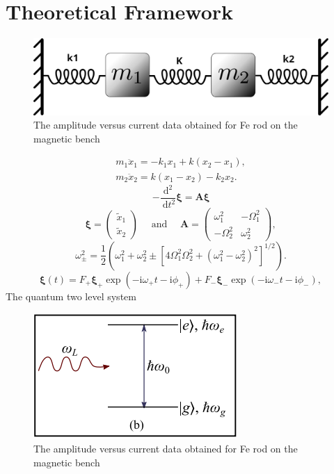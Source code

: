 \section{Theoretical Framework}
\begin{figure}[H]
	\centering
	\includegraphics[scale=0.3]{coupled1.png}
	\caption{The amplitude versus current data obtained for Fe rod on the magnetic bench}
	\label{fig:mb-fe-0}
\end{figure}
$$ \begin{array}{l}m_{1} \ddot{x}_{1}=-k_{1} x_{1}+k\left(x_{2}-x_{1}\right), \\ m_{2} \ddot{x}_{2}=k\left(x_{1}-x_{2}\right)-k_{2} x_{2} .\end{array}$$
$$-\frac{\mathrm{d}^{2}}{\mathrm{~d} t^{2}} \boldsymbol{\xi}=\mathbf{A} \boldsymbol{\xi}$$
$$ \boldsymbol{\xi}=\left(\begin{array}{l}\tilde{x}_{1} \\\tilde{x}_{2}\end{array}\right) \quad \text { and } \quad \mathbf{A}=\left(\begin{array}{cc}\omega_{1}^{2} & -\Omega_{1}^{2} \\-\Omega_{2}^{2} & \omega_{2}^{2}\end{array}\right),$$
$$\omega_{ \pm}^{2}=\frac{1}{2}\left(\omega_{1}^{2}+\omega_{2}^{2} \pm\left[4 \Omega_{1}^{2} \Omega_{2}^{2}+\left(\omega_{1}^{2}-\omega_{2}^{2}\right)^{2}\right]^{1 / 2}\right) .$$
$$
\boldsymbol{\xi}(t)=F_{+} \boldsymbol{\xi}_{+} \exp \left(-\mathrm{i} \omega_{+} t-\mathrm{i} \phi_{+}\right)+F_{-} \boldsymbol{\xi}_{-} \exp \left(-\mathrm{i} \omega_{-} t-\mathrm{i} \phi_{-}\right),$$
The quantum two level system\\
\begin{figure}[H]
	\centering
	\includegraphics[scale=1]{two level.png}
	\caption{The amplitude versus current data obtained for Fe rod on the magnetic bench}
	\label{fig:mb-fe-0}
\end{figure}
